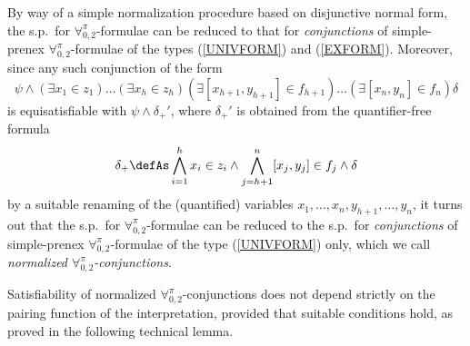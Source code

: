 \documentclass[submission,copyright,creativecommons]{eptcs}
\newcommand{\Lang}{\ensuremath{\mathbf{\forall}^{\pi}_{0,2}}\xspace}
\newcommand{\svx}{x}
\newcommand{\svy}{y}
\newcommand{\svz}{z}
\newcommand{\mvx}{f}
\begin{document}
By way of a simple normalization procedure based on disjunctive normal
form, the s.p.\ for \Lang-formulae can be reduced to
that for \emph{conjunctions} of simple-prenex \Lang-formulae of the
types (\ref{UNIVFORM}) and (\ref{EXFORM}).  Moreover, since any such
conjunction of the form
\[
\psi \wedge (\exists \svx_1 \in \svz_1) \ldots (\exists \svx_h \in
\svz_h)(\exists [\svx_{h+1}, \svy_{h+1}] \in \mvx_{h+1})\ldots(\exists
[\svx_n, \svy_n] \in \mvx_n)\delta
\]
is equisatisfiable with $\psi \wedge \delta_{+}' $, where
$\delta_{+}'$ is obtained from the quantifier-free formula
\[
\delta_{+} \defAs \bigwedge_{i=1}^{h} \svx_i \in \svz_i 
\wedge \bigwedge_{j=h+1}^{n} [\svx_{j}, \svy_{j}] \in \mvx_{j}
\wedge \delta
\]
by a suitable
renaming of the (quantified) variables
$x_{1},\ldots,x_{n},y_{h+1},\ldots,y_{n}$, 
it turns out that the s.p.\ for \Lang-formulae can be
reduced to the s.p.\ for \emph{conjunctions} of
simple-prenex \Lang-formulae of the type (\ref{UNIVFORM}) only, which
we call \emph{normalized \Lang-conjunctions}.

Satisfiability of normalized \Lang-conjunctions does not depend
strictly on the pairing function of the interpretation, provided that
suitable conditions hold, as proved in the following technical lemma.
\end{document}
